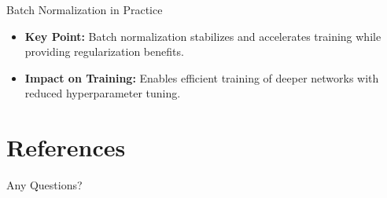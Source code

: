 \documentclass[serif, aspectratio=169]{beamer}
\begin{document}
\begin{frame}{Batch Normalization in Practice}
    
    \begin{itemize}

    \item \textbf{Key Point:} Batch normalization stabilizes and accelerates training while providing regularization benefits.
    \item \textbf{Impact on Training:} Enables efficient training of deeper networks with reduced hyperparameter tuning.

\end{itemize}

\end{frame}


\section{References}

\begin{frame}[allowframebreaks]
    
    
    \nocite{*} %
\end{frame}


\begin{frame}
    \begin{center}
        {\Huge Any Questions?}
    \end{center}
\end{frame}
\end{document}
